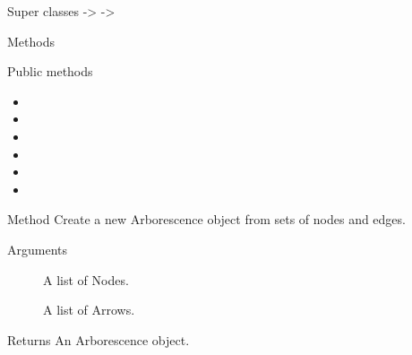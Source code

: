 \documentclass[a4paper]{book}
\begin{document}
%
\begin{Section}{Super classes}
 ->  -> 
\end{Section}
%
\begin{Section}{Methods}
%
\begin{SubSection}{Public methods}
\begin{itemize}

\item{} 
\item{} 
\item{} 
\item{} 
\item{} 
\item{} 

\end{itemize}

\end{SubSection}




\hypertarget{method-new}{}
%
\begin{SubSection}{Method }
Create a new Arborescence object from sets of nodes and edges.
%


%
\begin{SubSubSection}{Arguments}

\begin{description}

\item[] A list of Nodes.

\item[] A list of Arrows.

\end{description}


\end{SubSubSection}

%
\begin{SubSubSection}{Returns}
An Arborescence object.
\end{SubSubSection}


\end{SubSection}
\end{Section}
\end{document}
